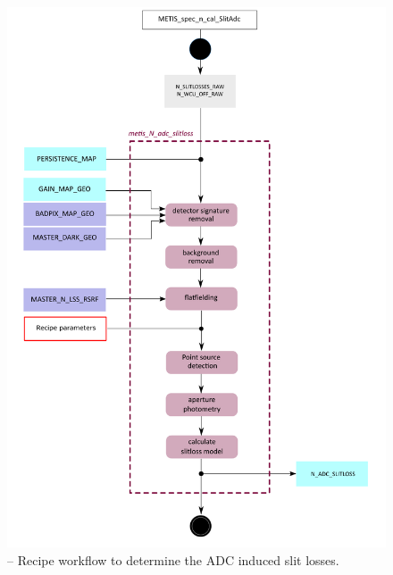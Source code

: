 \begin{figure}[ht]
  \centering
  \includegraphics[width=0.5\textheight]{figures/metis_n_lss_adc_slitloss_v0.74.pdf}
  \caption[Recipe: ]{ --
    Recipe workflow to determine the \ac{ADC} induced slit losses.}
  \label{Fig:rec_n_adc_slitloss}
\end{figure}

